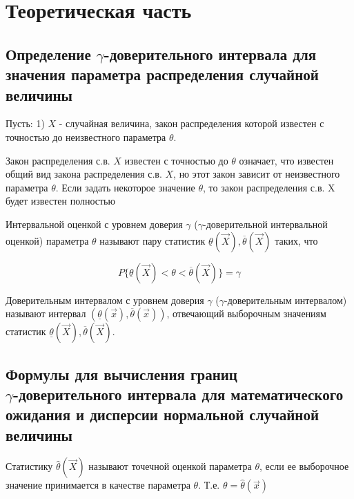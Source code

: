 \documentclass[12pt]{report}
\begin{document}
\chapter{Теоретическая часть}

\section{Определение $\gamma$-доверительного интервала для значения параметра распределения случайной величины}

Пусть:
1) $X$ - случайная величина, закон распределения которой
известен с точностью до неизвестного параметра $\theta$.

Закон распределения с.в. $X$ известен с точностью до $\theta$
означает, что известен общий вид закона распределения с.в. $X$, но этот закон
зависит от неизвестного параметра $\theta$.
Если задать некоторое значение $\theta$, 
то закон распределения с.в. X будет известен полностью

Интервальной оценкой с уровнем доверия $\gamma$ 
($\gamma$-доверительной интервальной оценкой) 
параметра $\theta$ называют пару статистик 
$\underline{\theta}(\vec X), \overline{\theta}(\vec X)$ таких, что

\begin{equation*}
    P\{\underline{\theta}(\vec X)<\theta<\overline{\theta}(\vec X)\}=\gamma
\end{equation*}


Доверительным интервалом с уровнем доверия $\gamma$ ($\gamma$-доверительным интервалом) называют интервал $(\underline{\theta}(\vec x), \overline{\theta}(\vec x))$, отвечающий выборочным значениям статистик $\underline{\theta}(\vec X), \overline{\theta}(\vec X)$.

\section{Формулы для вычисления границ \\ $\gamma$-доверительного интервала для математического ожидания и дисперсии нормальной случайной величины}

Статистику $\hat{\theta}(\vec{X})$ называют точечной оценкой параметра $\theta$,
если ее выборочное значение принимается в качестве параметра $\theta$.
Т.е. $\theta = \hat{\theta}(\vec{x})$ 
\end{document}
